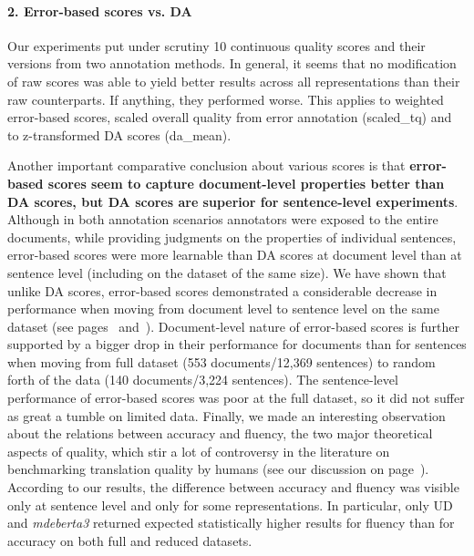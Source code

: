 \paragraph{2. Error-based scores vs. DA}
Our experiments put under scrutiny 10 continuous quality scores and their versions from two annotation methods.
In general, it seems that no modification of raw scores was able to yield better results across all representations than their raw counterparts. If anything, they performed worse. This applies to weighted error-based scores, scaled overall quality from error annotation (scaled\_tq) and to z-transformed DA scores (da\_mean).

Another important comparative conclusion about various scores is that \textbf{error-based scores seem to capture document-level properties better than DA scores, but DA scores are superior for sentence-level experiments}. 
Although in both annotation scenarios annotators were exposed to the entire documents, while providing judgments on the properties of individual sentences, error-based scores were more learnable than DA scores at document level than at sentence level (including on the dataset of the same size). We have shown that unlike DA scores, error-based scores demonstrated a considerable decrease in performance when moving from document level to sentence level on the same dataset (see pages~\pageref{pg:downward_slide} and~\pageref{pg:no_slide_for_da_when_moving_to_sent}). 
Document-level nature of error-based scores is further supported by a bigger drop in their performance for documents than for sentences when moving from full dataset (553 documents/12,369 sentences) to random forth of the data (140 documents/3,224 sentences). The sentence-level performance of error-based scores was poor at the full dataset, so it did not suffer as great a tumble on limited data.
Finally, we made an interesting observation about the relations between accuracy and fluency, the two major theoretical aspects of quality, which stir a lot of controversy in the literature on benchmarking translation quality by humans (see our discussion on page~\pageref{pg:controvercy_over_acc_and_flu}).
According to our results, the difference between accuracy and fluency was visible only at sentence level and only for some representations. In particular, only UD and \textit{mdeberta3} returned expected statistically higher results for fluency than for accuracy on both full and reduced datasets. %
